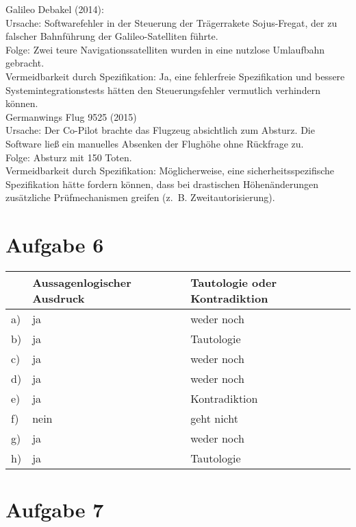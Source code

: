 \documentclass[a4paper,12pt]{article}
\begin{document}
Galileo Debakel (2014):\\
Ursache: Softwarefehler in der Steuerung der Trägerrakete Sojus-Fregat, der zu falscher Bahnführung der Galileo-Satelliten führte.\\
Folge: Zwei teure Navigationssatelliten wurden in eine nutzlose Umlaufbahn gebracht.\\
Vermeidbarkeit durch Spezifikation: Ja, eine fehlerfreie Spezifikation und bessere Systemintegrationstests hätten den Steuerungsfehler vermutlich verhindern können.\\

Germanwings Flug 9525 (2015)\\
Ursache: Der Co-Pilot brachte das Flugzeug absichtlich zum Absturz. Die Software ließ ein manuelles Absenken der Flughöhe ohne Rückfrage zu.\\
Folge: Absturz mit 150 Toten.\\
Vermeidbarkeit durch Spezifikation: Möglicherweise, eine sicherheitsspezifische Spezifikation hätte fordern können, dass bei drastischen Höhenänderungen zusätzliche Prüfmechanismen greifen (z.~B. Zweitautorisierung).

\section*{Aufgabe 6}

\begin{table}[h!]
    \centering
    \begin{tabular}{|l|l|l|}
    \hline
    & Aussagenlogischer Ausdruck & Tautologie oder Kontradiktion \\ \hline
    a) & ja & weder noch \\ \hline
    b) & ja & Tautologie \\ \hline
    c) & ja & weder noch \\ \hline
    d) & ja & weder noch \\ \hline
    e) & ja & Kontradiktion \\ \hline
    f) & nein & geht nicht \\ \hline
    g) & ja & weder noch \\ \hline
    h) & ja & Tautologie \\ \hline
    \end{tabular}
    \end{table}

\section*{Aufgabe 7}
\end{document}
